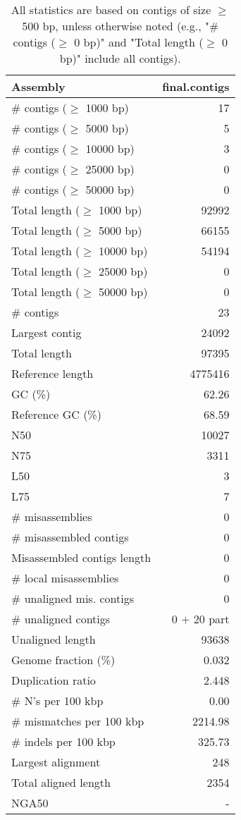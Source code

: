 \documentclass[12pt,a4paper]{article}
\begin{document}
\begin{table}[ht]
\begin{center}
\caption{All statistics are based on contigs of size $\geq$ 500 bp, unless otherwise noted (e.g., "\# contigs ($\geq$ 0 bp)" and "Total length ($\geq$ 0 bp)" include all contigs).}
\begin{tabular}{|l*{1}{|r}|}
\hline
Assembly & final.contigs \\ \hline
\# contigs ($\geq$ 1000 bp) & 17 \\ \hline
\# contigs ($\geq$ 5000 bp) & 5 \\ \hline
\# contigs ($\geq$ 10000 bp) & 3 \\ \hline
\# contigs ($\geq$ 25000 bp) & 0 \\ \hline
\# contigs ($\geq$ 50000 bp) & 0 \\ \hline
Total length ($\geq$ 1000 bp) & 92992 \\ \hline
Total length ($\geq$ 5000 bp) & 66155 \\ \hline
Total length ($\geq$ 10000 bp) & 54194 \\ \hline
Total length ($\geq$ 25000 bp) & 0 \\ \hline
Total length ($\geq$ 50000 bp) & 0 \\ \hline
\# contigs & 23 \\ \hline
Largest contig & 24092 \\ \hline
Total length & 97395 \\ \hline
Reference length & 4775416 \\ \hline
GC (\%) & 62.26 \\ \hline
Reference GC (\%) & 68.59 \\ \hline
N50 & 10027 \\ \hline
N75 & 3311 \\ \hline
L50 & 3 \\ \hline
L75 & 7 \\ \hline
\# misassemblies & 0 \\ \hline
\# misassembled contigs & 0 \\ \hline
Misassembled contigs length & 0 \\ \hline
\# local misassemblies & 0 \\ \hline
\# unaligned mis. contigs & 0 \\ \hline
\# unaligned contigs & 0 + 20 part \\ \hline
Unaligned length & 93638 \\ \hline
Genome fraction (\%) & 0.032 \\ \hline
Duplication ratio & 2.448 \\ \hline
\# N's per 100 kbp & 0.00 \\ \hline
\# mismatches per 100 kbp & 2214.98 \\ \hline
\# indels per 100 kbp & 325.73 \\ \hline
Largest alignment & 248 \\ \hline
Total aligned length & 2354 \\ \hline
NGA50 & - \\ \hline
\end{tabular}
\end{center}
\end{table}
\end{document}
